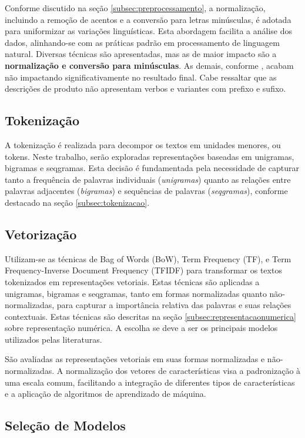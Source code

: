 Conforme discutido na seção \ref{subsec:preprocessamento}, a normalização, incluindo a remoção de acentos e a conversão para letras minúsculas, é adotada para uniformizar as variações linguísticas. Esta abordagem facilita a análise dos dados, alinhando-se com as práticas padrão em processamento de linguagem natural.  Diversas técnicas são apresentadas, mas as de maior impacto são a \textbf{normalização e conversão para minúsculas}.  As demais, conforme \cite{naseem2021survey}, acabam não impactando significativamente no resultado final.  Cabe ressaltar que as descrições de produto não apresentam verbos e variantes com prefixo e sufixo.

\subsection{Tokenização}
A tokenização é realizada para decompor os textos em unidades menores, ou tokens. Neste trabalho, serão exploradas representações baseadas em unigramas, bigramas e seqgramas. Esta decisão é fundamentada pela necessidade de capturar tanto a frequência de palavras individuais (\textit{unigramas}) quanto as relações entre palavras adjacentes (\textit{bigramas}) e sequências de palavras (\textit{seqgramas}), conforme destacado na seção \ref{subsec:tokenizacao}.

\subsection{Vetorização}
Utilizam-se as técnicas de Bag of Words (BoW), Term Frequency (TF), e Term Frequency-Inverse Document Frequency (TFIDF) para transformar os textos tokenizados em representações vetoriais. Estas técnicas são aplicadas a unigramas, bigramas e seqgramas, tanto em formas normalizadas quanto não-normalizadas, para capturar a importância relativa das palavras e suas relações contextuais.  Estas técnicas são descritas na seção \ref{subsec:representacaonumerica} sobre representação numérica.  A escolha se deve a ser os principais modelos utilizados pelas literaturas.

São avaliadas as representações vetoriais em suas formas normalizadas e não-normalizadas. A normalização dos vetores de características visa a padronização à uma escala comum, facilitando a integração de diferentes tipos de características e a aplicação de algoritmos de aprendizado de máquina.

\subsection{Seleção de Modelos}

